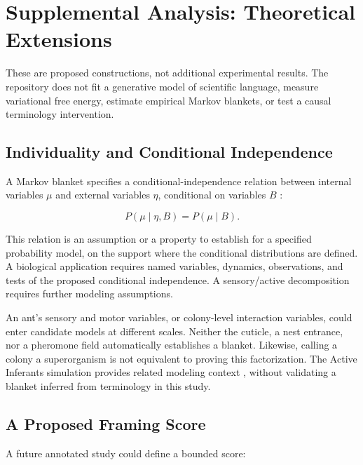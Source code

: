 \documentclass[
]{article}
\numberwithin{equation}{section}
\begin{document}
\section{Supplemental Analysis: Theoretical
Extensions}\label{sec:supplemental_analysis}

These are proposed constructions, not additional experimental results.
The repository does not fit a generative model of scientific language,
measure variational free energy, estimate empirical Markov blankets, or
test a causal terminology intervention.

\subsection{Individuality and Conditional
Independence}\label{individuality-and-conditional-independence}

A Markov blanket specifies a conditional-independence relation between
internal variables \(\mu\) and external variables \(\eta\), conditional
on variables \(B\) \citep{friston2013life, kirchhoff2018markov}:

\begin{equation}\label{eq:markov_blanket}
P(\mu\mid\eta,B)=P(\mu\mid B).
\end{equation}

This relation is an assumption or a property to establish for a
specified probability model, on the support where the conditional
distributions are defined. A biological application requires named
variables, dynamics, observations, and tests of the proposed conditional
independence. A sensory/active decomposition requires further modeling
assumptions.

An ant's sensory and motor variables, or colony-level interaction
variables, could enter candidate models at different scales. Neither the
cuticle, a nest entrance, nor a pheromone field automatically
establishes a blanket. Likewise, calling a colony a superorganism is not
equivalent to proving this factorization. The Active Inferants
simulation provides related modeling context \citep{friedman2021active},
without validating a blanket inferred from terminology in this study.

\subsection{A Proposed Framing Score}\label{a-proposed-framing-score}

A future annotated study could define a bounded score:
\end{document}
